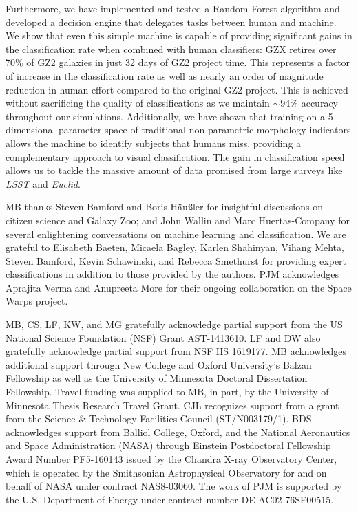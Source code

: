 \documentclass[twocolumn,  trackchanges, ]{aastex6}%
\begin{document}
Furthermore, we have implemented and tested a Random Forest algorithm and developed a decision engine that delegates tasks between human and machine.  We show that even this simple machine is capable of providing significant gains in the classification rate when combined with human classifiers: GZX  retires over 70\% of GZ2 galaxies in just 32 days of GZ2 project time.  This represents a factor of  increase in the classification rate as well as nearly an order of magnitude reduction in human effort compared to the original GZ2 project. This is achieved without sacrificing the quality of classifications as we maintain $\sim$94\% accuracy  throughout our simulations. Additionally, we have shown that training on a 5-dimensional parameter space of traditional non-parametric morphology indicators allows the machine to identify subjects that humans miss, providing  a complementary approach to visual classification. The gain in classification speed allows us to tackle the massive amount of data promised  from large surveys like \textit{LSST} and \textit{Euclid}.


\acknowledgements
MB thanks Steven Bamford and Boris H{\"a}u{\ss}ler for insightful discussions on citizen science and Galaxy Zoo; and John Wallin and Marc Huertas-Company for several enlightening conversations on machine learning and classification. 
We are grateful to Elisabeth Baeten, Micaela Bagley, Karlen Shahinyan, Vihang Mehta, Steven Bamford, Kevin Schawinski, and Rebecca Smethurst for providing expert classifications in addition to those provided by the authors. PJM acknowledges Aprajita Verma and Anupreeta More for their ongoing collaboration on the Space Warps project. 

MB, CS, LF, KW, and MG gratefully acknowledge partial support from the US National Science Foundation (NSF) Grant AST-1413610. LF and DW also gratefully acknowledge partial support from NSF IIS 1619177.  MB acknowledges additional support 
through New College and Oxford University's Balzan Fellowship as well as the University
of Minnesota Doctoral Dissertation Fellowship. Travel funding was supplied 
to MB, in part, by the University of Minnesota Thesis Research Travel Grant. CJL recognizes support from a grant from the Science \& Technology Facilities Council (ST/N003179/1). 
BDS acknowledges support from Balliol College, Oxford, and the National Aeronautics and Space Administration (NASA) through Einstein Postdoctoral Fellowship Award Number PF5-160143 issued by the Chandra X-ray Observatory Center, which is operated by the Smithsonian Astrophysical Observatory for and on behalf of NASA under contract NAS8-03060. The work of PJM is supported by the U.S. Department of Energy under contract number DE-AC02-76SF00515.
\end{document}
